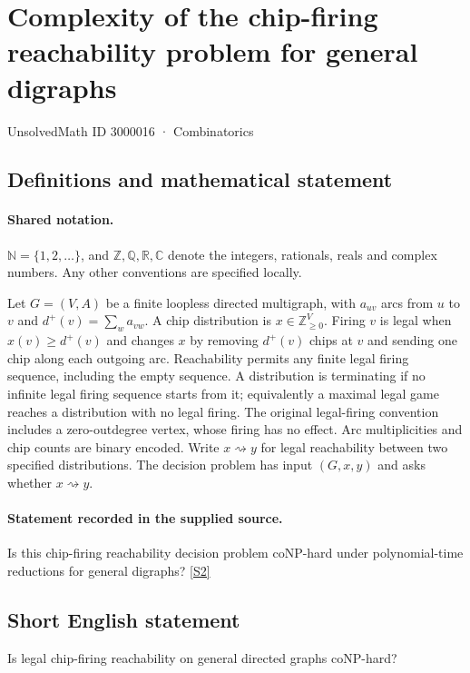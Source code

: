 \documentclass[11pt]{article}
\newcommand{\sref}[2]{\hyperlink{source:#1:#2}{[S#2]}}
\begin{document}
\setcounter{section}{3000015}
\section{Complexity of the chip-firing reachability problem for general digraphs}\label{3000016}
{\small\sffamily UnsolvedMath ID 3000016 · Combinatorics}
\subsection{Definitions and mathematical statement}

\paragraph{Shared notation.}$\mathbb N=\{1,2,\ldots\}$, and $\mathbb Z,\mathbb Q,\mathbb R,\mathbb C$ denote the integers, rationals, reals and complex numbers. Any other conventions are specified locally.


Let $G=(V,A)$ be a finite loopless directed multigraph, with $a_{uv}$ arcs from $u$ to $v$ and $d^+(v)=\sum_w a_{vw}$. A chip distribution is $x\in\mathbb Z_{\ge0}^{V}$. Firing $v$ is legal when $x(v)\ge d^+(v)$ and changes $x$ by removing $d^+(v)$ chips at $v$ and sending one chip along each outgoing arc. Reachability permits any finite legal firing sequence, including the empty sequence. A distribution is terminating if no infinite legal firing sequence starts from it; equivalently a maximal legal game reaches a distribution with no legal firing. The original legal-firing convention includes a zero-outdegree vertex, whose firing has no effect. Arc multiplicities and chip counts are binary encoded. Write $x\rightsquigarrow y$ for legal reachability between two specified distributions. The decision problem has input $(G,x,y)$ and asks whether $x\rightsquigarrow y$.
\paragraph{Statement recorded in the supplied source.}
Is this chip-firing reachability decision problem coNP-hard under polynomial-time reductions for general digraphs? \sref{3000016}{2}
\subsection{Short English statement}
Is legal chip-firing reachability on general directed graphs coNP-hard?
\end{document}
